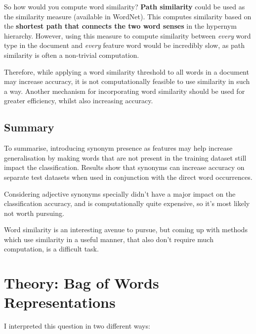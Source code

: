 \documentclass{article}
\begin{document}
So how would you compute word similarity? \textbf{Path similarity} could be used as the similarity measure (available in WordNet). This computes similarity based on the \textbf{shortest path that connects the two word senses} in the hypernym hierarchy. However, using this measure to compute similarity between \textit{every} word type in the document and \textit{every} feature word would be incredibly slow, as path similarity is often a non-trivial computation.

Therefore, while applying a word similarity threshold to all words in a document may increase accuracy, it is not computationally feasible to use similarity in such a way. Another mechanism for incorporating word similarity should be used for greater efficiency, whilst also increasing accuracy.

\subsection{Summary}

To summarise, introducing synonym presence as features may help increase generalisation by making words that are not present in the training dataset still impact the classification. Results show that synonyms can increase accuracy on separate test datasets when used in conjunction with the direct word occurrences.

Considering adjective synonyms specially didn't have a major impact on the classification accuracy, and is computationally quite expensive, so it's most likely not worth pursuing.

Word similarity is an interesting avenue to pursue, but coming up with methods which use similarity in a useful manner, that also don't require much computation, is a difficult task.

\section{Theory: Bag of Words Representations}

I interpreted this question in two different ways:
\end{document}
